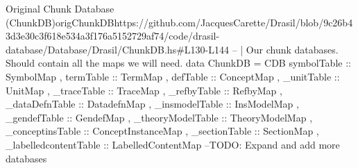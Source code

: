 \begin{haskell}{Original Chunk Database (ChunkDB)}{origChunkDB}{https://github.com/JacquesCarette/Drasil/blob/9c26b43d3e30c3f618e534a3f176a5152729af74/code/drasil-database/Database/Drasil/ChunkDB.hs\#L130-L144}
-- | Our chunk databases. Should contain all the maps we will need.
data ChunkDB = CDB { symbolTable :: SymbolMap
                   , termTable :: TermMap 
                   , defTable  :: ConceptMap
                   , _unitTable :: UnitMap
                   , _traceTable :: TraceMap
                   , _refbyTable :: RefbyMap
                   , _dataDefnTable  :: DatadefnMap
                   , _insmodelTable   :: InsModelMap
                   , _gendefTable   :: GendefMap
                   , _theoryModelTable :: TheoryModelMap
                   , _conceptinsTable :: ConceptInstanceMap
                   , _sectionTable :: SectionMap
                   , _labelledcontentTable :: LabelledContentMap
                   } --TODO: Expand and add more databases
\end{haskell}

